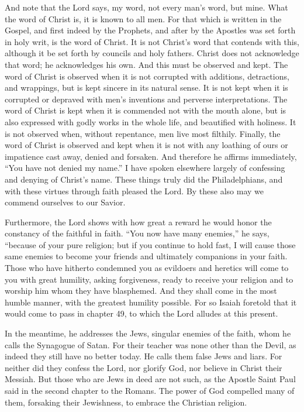 And note that the Lord says, my word, not every man’s word, but mine. What the word of Christ is, it is known to all men. For that which is written in the Gospel, and first indeed by the Prophets, and after by the Apostles was set forth in holy writ, is the word of Christ. It is not Christ's word that contends with this, although it be set forth by councils and holy fathers. Christ does not acknowledge that word; he acknowledges his own. And this must be observed and kept. The word of Christ is observed when it is not corrupted with additions, detractions, and wrappings, but is kept sincere in its natural sense. It is not kept when it is corrupted or depraved with men's inventions and perverse interpretations. The word of Christ is kept when it is commended not with the mouth alone, but is also expressed with godly works in the whole life, and beautified with holiness. It is not observed when, without repentance, men live most filthily. Finally, the word of Christ is observed and kept when it is not with any loathing of ours or impatience cast away, denied and forsaken. And therefore he affirms immediately, “You have not denied my name.” I have spoken elsewhere largely of confessing and denying of Christ's name. These things truly did the Philadelphians, and with these virtues through faith pleased the Lord. By these also may we commend ourselves to our Savior.

Furthermore, the Lord shows with how great a reward he would honor the constancy of the faithful in faith. “You now have many enemies,” he says, “because of your pure religion; but if you continue to hold fast, I will cause those same enemies to become your friends and ultimately companions in your faith. Those who have hitherto condemned you as evildoers and heretics will come to you with great humility, asking forgiveness, ready to receive your religion and to worship him whom they have blasphemed. And they shall come in the most humble manner, with the greatest humility possible. For so Isaiah foretold that it would come to pass in chapter 49, to which the Lord alludes at this present.

In the meantime, he addresses the Jews, singular enemies of the faith, whom he calls the Synagogue of Satan. For their teacher was none other than the Devil, as indeed they still have no better today. He calls them false Jews and liars. For neither did they confess the Lord, nor glorify God, nor believe in Christ their Messiah. But those who are Jews in deed are not such, as the Apostle Saint Paul said in the second chapter to the Romans. The power of God compelled many of them, forsaking their Jewishness, to embrace the Christian religion.


